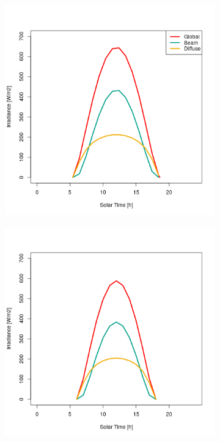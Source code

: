 \begin{figure}[H]
\vspace{-2ex}
	\centering
    \setlength{\subfigureWidth}{0.50\textwidth}
    \setlength{\graphicsHeight}{80mm}
    \hypersetup{hidelinks=true}%
  	\begin{subfigure}[t]{\subfigureWidth}
      \centering
  		\includegraphics[height=\graphicsHeight]{sections/martian-environment/plots/diurnal-irradiance-variation-1-for-ls-248-phi-20-and-tau-05.png}
  		\label{fig:sub:irradiance-phi-m20}
  	\end{subfigure}\hfill
    \begin{subfigure}[t]{\subfigureWidth}
      \centering
  		\includegraphics[height=\graphicsHeight]{sections/martian-environment/plots/diurnal-irradiance-variation-2-for-ls-248-phi-0-and-tau-05.png}

\end{subfigure}
\end{figure}
